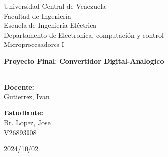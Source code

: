\thispagestyle{mystyle}

\begin{center}

    \begin{center}
        \Large{Universidad Central de Venezuela}\\
        \Large{Facultad de Ingeniería}\\
        \Large{Escuela de Ingeniería Eléctrica}\\
        \Large{Departamento de Electronica, computación y control}\\
        \Large{Microprocesadores I}
    \end{center}
    \vfill

    \LARGE{\textbf{Proyecto Final: Convertidor Digital-Analogico}}\\
    \vspace{0.25cm}
    \huge{\textbf{}}\\
    \vfill

    \LARGE{\textbf{Docente:}}\\
    \vspace{0.1cm}
    \Large{Gutierrez, Ivan}\\
    \vspace{1cm}


    \LARGE{\textbf{Estudiante:}}\\
    \vspace{0.1cm}
    \Large{Br. Lopez, Jose}\\
    \vspace{0.07cm}
    \Large{V26893008}

    \vfill
    \textsc{\normalsize{2024/10/02}}
\end{center} 